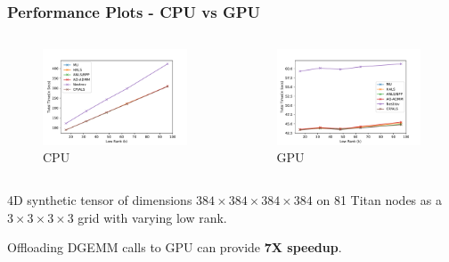 \documentclass{beamer}
\begin{document}
\begin{frame}
\frametitle{Performance Plots - CPU vs GPU}
\begin{columns}[onlytextwidth]
\begin{column}{.5\textwidth}
\begin{figure}
  \includegraphics[width=\textwidth]{cpuvsgpulr810}
  \caption{CPU}
\end{figure}
\end{column}
\hfill
\begin{column}{.5\textwidth}
\begin{figure}
  \includegraphics[width=\textwidth]{cpuvsgpulr811}
  \caption{GPU}
\end{figure}
\end{column}
\end{columns}
\begin{center}
\footnotesize{4D synthetic tensor of dimensions $384 \times 384 \times 384 \times 384$ on 81 Titan nodes as a $3 \times 3 \times 3 \times 3$ grid with varying low rank.} 
\end{center}
\begin{center}
Offloading DGEMM calls to GPU can provide \textbf{7X speedup}.
\end{center}
\end{frame}
\end{document}
